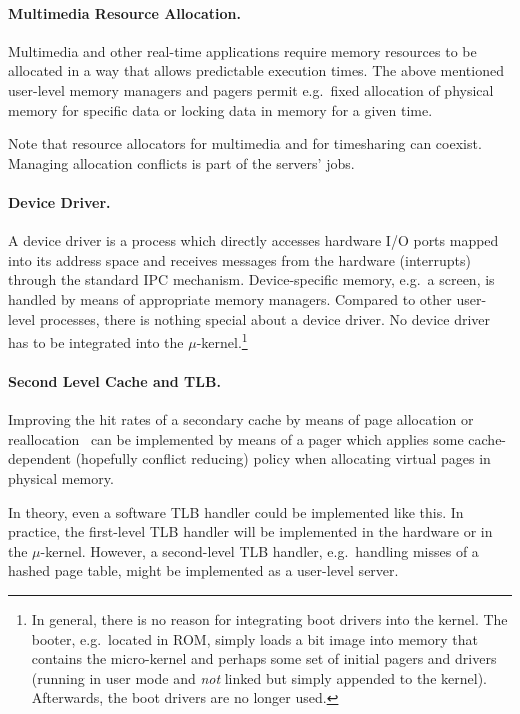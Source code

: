 \documentclass[a4paper,11pt,twoside,dvips]{book}
\newcommand{\micro}{$\mu$}
\begin{document}
 
 
\paragraph{Multimedia Resource Allocation.} 
Multimedia and other real-time applications require memory resources to
be allocated in a way that allows predictable execution times.
The above mentioned user-level memory managers and pagers permit e.g.\ fixed
allocation of physical memory for specific data or locking data in memory
for a given time.

Note that resource allocators for multimedia and for timesharing can
coexist. Managing allocation conflicts is part of the servers' jobs. 
 
\paragraph{Device Driver.} 
A device driver is a process which directly accesses hardware
I/O ports mapped into its address space and receives messages from the
hardware
(interrupts) through the standard IPC mechanism. Device-specific memory,
e.g.\ a screen, is handled by means of appropriate memory managers.
Compared to other user-level processes, there is nothing special about a
device driver. No device driver has to be integrated into the
\micro-kernel.\footnote{ 
In general, there is no reason for integrating boot drivers into
the kernel. The booter, e.g.\ located in ROM, simply loads a bit image into
memory that contains the micro-kernel and perhaps some set of initial pagers
and drivers (running in user mode and {\em not} linked but simply
appended to the kernel). Afterwards, the boot drivers are no longer
used.} 
 
 
\paragraph{Second Level Cache and TLB.} 
Improving the hit rates of a secondary cache by means of page allocation or
reallocation~\cite{kessler:page-placement,romer:dynmap} can be implemented by
means of a pager which applies some cache-dependent (hopefully conflict
reducing) policy when allocating virtual pages in physical memory. 
 
In theory, even a software TLB handler could be implemented like this. In
practice, the first-level TLB handler will be implemented in the
hardware or in the \micro-kernel. However, a second-level TLB handler, e.g.\
handling misses of a hashed page table, might be implemented as a user-level
server. 
 
\end{document}

